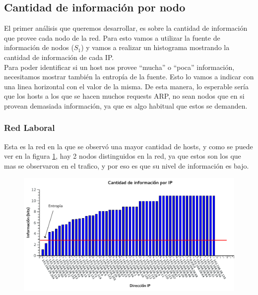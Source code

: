 \FloatBarrier
\subsection{Cantidad de información por nodo}

El primer análisis que queremos desarrollar, es sobre la cantidad de información que provee cada nodo de la red. Para esto vamos a utilizar la fuente de información de nodos ($S_1$) y vamos a realizar un histograma mostrando la cantidad de información de cada IP. \\

Para poder identificar si un host nos provee ``mucha'' o ``poca'' información, necesitamos mostrar también la entropía de la fuente. Esto lo vamos a indicar con una linea horizontal con el valor de la misma. De esta manera, lo esperable sería que los hosts a los que se hacen muchos requests ARP, no sean nodos que en si provean demasiada información, ya que es algo habitual que estos se demanden.

\FloatBarrier
\subsubsection{Red Laboral}

Esta es la red en la que se observó una mayor cantidad de hosts, y como se puede ver en la figura \ref{fig:info-baufest}, hay 2 nodos distinguidos en la red, ya que estos son los que mas se observaron en el trafico, y por eso es que su nivel de información es bajo.

\begin{figure}[h!]
  \begin{center}
    \includegraphics[scale=0.9]{graficos/informacion-baufest.pdf}
	\caption{}
    \label{fig:info-baufest}  
  \end{center}
\end{figure}

